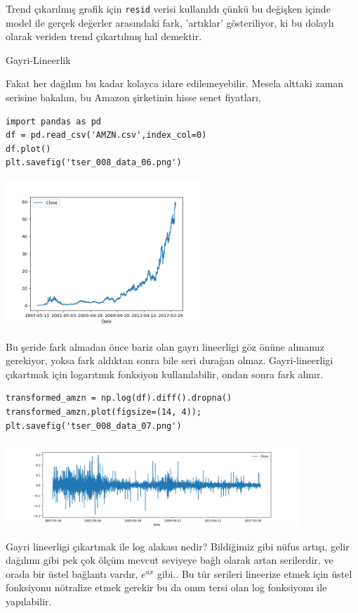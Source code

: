 \documentclass[12pt,fleqn]{article}\usepackage{../../common}
\begin{document}
Trend çıkarılmış grafik için \verb!resid! verisi kullanıldı çünkü bu değişken
içinde model ile gerçek değerler arasındaki fark, 'artıklar' gösteriliyor, ki bu
dolaylı olarak veriden trend çıkartılmış hal demektir.

Gayri-Lineerlik

Fakat her dağılım bu kadar kolayca idare edilemeyebilir. Mesela alttaki
zaman serisine bakalım, bu Amazon şirketinin hisse senet fiyatları,

\begin{verbatim}
import pandas as pd
df = pd.read_csv('AMZN.csv',index_col=0)
df.plot()
plt.savefig('tser_008_data_06.png')
\end{verbatim}

\includegraphics[width=20em]{tser_008_data_06.png}

Bu şeride fark almadan önce bariz olan gayrı lineerligi göz önüne almamız
gerekiyor, yoksa fark aldıktan sonra bile seri durağan olmaz. Gayri-lineerligi
çıkartmak için logarıtmık fonksiyon kullanılabilir, ondan sonra fark alınır.

\begin{verbatim}
transformed_amzn = np.log(df).diff().dropna()
transformed_amzn.plot(figsize=(14, 4));
plt.savefig('tser_008_data_07.png')
\end{verbatim}

\includegraphics[width=30em]{tser_008_data_07.png}

Gayri lineerligi çıkartmak ile log alakası nedir? Bildiğimiz gibi
nüfus artışı, gelir dağılımı gibi pek çok ölçüm mevcut seviyeye bağlı
olarak artan serilerdir, ve orada bir üstel bağlantı vardır, $e^{ax}$
gibi.. Bu tür serileri lineerize etmek için üstel fonksiyonu nötralize
etmek gerekir bu da onun tersi olan log fonksiyonu ile yapılabilir.
\end{document}
